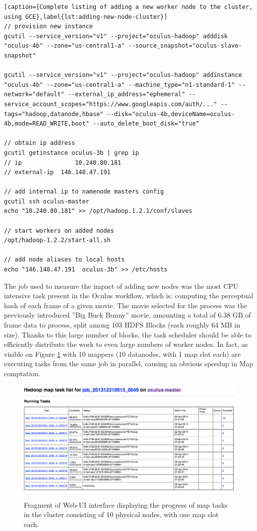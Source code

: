 \begin{lstlisting}[caption={Complete listing of adding a new worker node to the cluster, using GCE},label{lst:adding-new-node-cluster}]
// provision new instance
gcutil --service_version="v1" --project="oculus-hadoop" adddisk "oculus-4b" --zone="us-central1-a" --source_snapshot="oculus-slave-snapshot"

gcutil --service_version="v1" --project="oculus-hadoop" addinstance "oculus-4b" --zone="us-central1-a" --machine_type="n1-standard-1" --network="default" --external_ip_address="ephemeral" --service_account_scopes="https://www.googleapis.com/auth/..." --tags="hadoop,datanode,hbase" --disk="oculus-4b,deviceName=oculus-4b,mode=READ_WRITE,boot" --auto_delete_boot_disk="true"

// obtain ip address
gcutil getinstance oculus-3b | grep ip
// ip               10.240.80.181
// external-ip  146.148.47.191

// add internal ip to namenode masters config
gcutil ssh oculus-master
echo "10.240.80.181" >> /opt/hadoop.1.2.1/conf/slaves

// start workers on added nodes
/opt/hadoop-1.2.2/start-all.sh

// add node aliases to local hosts
echo "146.148.47.191  oculus-3b" >> /etc/hosts
\end{lstlisting}

The job used to measure the impact of adding new nodes was the most CPU intensive task present in the Oculus workflow, which is: computing the perceptual hash of each frame of a given movie. The movie selected for the process was the previously introduced ''Big Buck Bunny'' movie, amounting a total of 6.38 GB of frame data to process, split among 103 HDFS Blocks (each roughly 64 MB in size). Thanks to this large number of blocks, the task scheduler should be able to efficiently distribute the work to even large numbers of worker nodes. In fact, as visible on Figure \ref{fig:ten-mappers} with 10 mappers (10 datanodes, with 1 map slot each) are executing tasks from the same job in parallel, causing an obvious speedup in Map comptation.

\begin{figure}[ch!]
  \centering
  \includegraphics[width=\textwidth]{img/hadoop/10tasks-parallel}
  \label{fig:ten-mappers}
  \caption{Fragment of Web-UI interface displaying the progress of map tasks in the cluster consisting of 10 physical nodes, with one map slot each.}
\end{figure}

